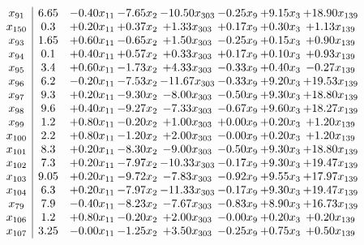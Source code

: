 \documentclass[8pt]{article}
\begin{document}
\[\begin{array}{c| c c@{\hskip 2pt} c@{\hskip 2pt} c@{\hskip 2pt} c@{\hskip 2pt} c@{\hskip 2pt} c@{\hskip 2pt} }
 x_{91}   &  6.65 & -0.40 x_{11} & -7.65 x_{2} & -10.50 x_{303} & -0.25 x_{9} & +  9.15 x_{3} & + 18.90 x_{139}\\
 x_{150}   &  0.3 & +  0.20 x_{11} & +  0.37 x_{2} & +  1.33 x_{303} & +  0.17 x_{9} & +  0.30 x_{3} & +  1.13 x_{139}\\
 x_{93}   &  1.65 & +  0.60 x_{11} & -0.65 x_{2} & +  1.50 x_{303} & -0.25 x_{9} & +  0.15 x_{3} & +  0.90 x_{139}\\
 x_{94}   &  0.1 & +  0.40 x_{11} & +  0.57 x_{2} & +  0.33 x_{303} & +  0.17 x_{9} & +  0.10 x_{3} & +  0.93 x_{139}\\
 x_{95}   &  3.4 & +  0.60 x_{11} & -1.73 x_{2} & +  4.33 x_{303} & -0.33 x_{9} & +  0.40 x_{3} & -0.27 x_{139}\\
 x_{96}   &  6.2 & -0.20 x_{11} & -7.53 x_{2} & -11.67 x_{303} & -0.33 x_{9} & +  9.20 x_{3} & + 19.53 x_{139}\\
 x_{97}   &  9.3 & +  0.20 x_{11} & -9.30 x_{2} & -8.00 x_{303} & -0.50 x_{9} & +  9.30 x_{3} & + 18.80 x_{139}\\
 x_{98}   &  9.6 & +  0.40 x_{11} & -9.27 x_{2} & -7.33 x_{303} & -0.67 x_{9} & +  9.60 x_{3} & + 18.27 x_{139}\\
 x_{99}   &  1.2 & +  0.80 x_{11} & -0.20 x_{2} & +  1.00 x_{303} & +  0.00 x_{9} & +  0.20 x_{3} & +  1.20 x_{139}\\
 x_{100}   &  2.2 & +  0.80 x_{11} & -1.20 x_{2} & +  2.00 x_{303} & -0.00 x_{9} & +  0.20 x_{3} & +  1.20 x_{139}\\
 x_{101}   &  8.3 & +  0.20 x_{11} & -8.30 x_{2} & -9.00 x_{303} & -0.50 x_{9} & +  9.30 x_{3} & + 18.80 x_{139}\\
 x_{102}   &  7.3 & +  0.20 x_{11} & -7.97 x_{2} & -10.33 x_{303} & -0.17 x_{9} & +  9.30 x_{3} & + 19.47 x_{139}\\
 x_{103}   &  9.05 & +  0.20 x_{11} & -9.72 x_{2} & -7.83 x_{303} & -0.92 x_{9} & +  9.55 x_{3} & + 17.97 x_{139}\\
 x_{104}   &  6.3 & +  0.20 x_{11} & -7.97 x_{2} & -11.33 x_{303} & -0.17 x_{9} & +  9.30 x_{3} & + 19.47 x_{139}\\
 x_{79}   &  7.9 & -0.40 x_{11} & -8.23 x_{2} & -7.67 x_{303} & -0.83 x_{9} & +  8.90 x_{3} & + 16.73 x_{139}\\
 x_{106}   &  1.2 & +  0.80 x_{11} & -0.20 x_{2} & +  2.00 x_{303} & -0.00 x_{9} & +  0.20 x_{3} & +  0.20 x_{139}\\
 x_{107}   &  3.25 & -0.00 x_{11} & -1.25 x_{2} & +  3.50 x_{303} & -0.25 x_{9} & +  0.75 x_{3} & +  0.50 x_{139}\\

\end{array}\]
\end{document}
